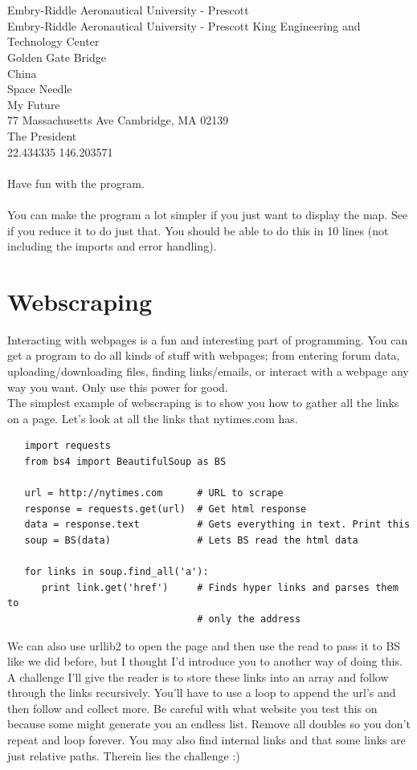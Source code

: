 \documentclass[11pt]{article}   %
\begin{document}
\\\\
Embry-Riddle Aeronautical University - Prescott\\
Embry-Riddle Aeronautical University - Prescott King Engineering and Technology Center\\
Golden Gate Bridge\\
China\\
Space Needle\\
My Future\\
77 Massachusetts Ave Cambridge, MA 02139\\
The President\\
22.434335 146.203571\\\\
Have fun with the program.\\

\\
You can make the program a lot simpler if you just want to display the map.  See if you reduce it to do just that.  You should be able to do this in 10 
lines (not including the imports and error handling).  \\

\section*{Webscraping}
Interacting with webpages is a fun and interesting part of programming.  You can get a program to do all kinds of stuff with webpages; from entering forum data, uploading/downloading files, finding links/emails, or interact with a
webpage any way you want.  Only use this power for good.
\\
The simplest example of webscraping is to show you how to gather all the links on a page.  Let's look at all the links that nytimes.com has.
\begin{tcolorbox}
   \begin{lstlisting}
   import requests
   from bs4 import BeautifulSoup as BS

   url = http://nytimes.com      # URL to scrape
   response = requests.get(url)  # Get html response
   data = response.text          # Gets everything in text. Print this
   soup = BS(data)               # Lets BS read the html data

   for links in soup.find_all('a'):
      print link.get('href')     # Finds hyper links and parses them to 
                                 # only the address
   \end{lstlisting}
\end{tcolorbox}
We can also use urllib2 to open the page and then use the read to pass it to BS like we did before, but I thought I'd introduce you to another way of doing this.\\
A challenge I'll give the reader is to store these links into an array and follow through the links recursively.  You'll have to use a loop to append the url's and then follow and collect more.  Be careful with what website you test
this on because some might generate you an endless list.  Remove all doubles so you don't repeat and loop forever.  You may also find internal links and that some links are just relative paths.  Therein lies the challenge :)
\\
\end{document}
